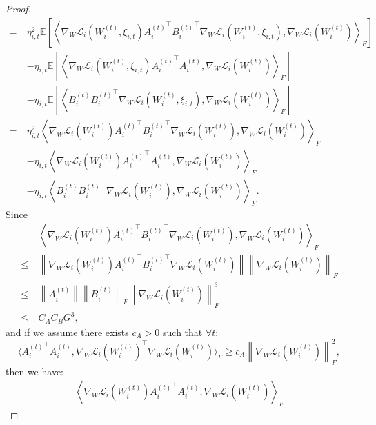 \begin{proof}
\begin{align*}
= \ & \eta_{i,t}^2 \mathbb{E}\left[\left\langle \nabla_{W}\mathcal{L}_i(W_i^{(t)},\xi_{i,t}){A_i^{(t)}}^{\top}{B_i^{(t)}}^{\top}\nabla_{W}\mathcal{L}_i(W_i^{(t)},\xi_{i,t}),\nabla_{W}\mathcal{L}_i(W_i^{(t)})\right\rangle_F\right]\\
& - \eta_{i,t}\mathbb{E}\left[\left\langle \nabla_{W}\mathcal{L}_i(W_i^{(t)},\xi_{i,t}){A_i^{(t)}}^{\top}A_i^{(t)},\nabla_{W}\mathcal{L}_i(W_i^{(t)})\right\rangle_F\right]\\
& - \eta_{i,t}\mathbb{E}\left[\left\langle B_i^{(t)}{B_i^{(t)}}^{\top}\nabla_{W}\mathcal{L}_i(W_i^{(t)},\xi_{i,t}),\nabla_{W}\mathcal{L}_i(W_i^{(t)})\right\rangle_F\right]\\
= \ & \eta_{i,t}^2 \left\langle \nabla_{W}\mathcal{L}_i(W_i^{(t)}){A_i^{(t)}}^{\top}{B_i^{(t)}}^{\top}\nabla_{W}\mathcal{L}_i(W_i^{(t)}),\nabla_{W}\mathcal{L}_i(W_i^{(t)})\right\rangle_F\\
& - \eta_{i,t}\left\langle \nabla_{W}\mathcal{L}_i(W_i^{(t)}){A_i^{(t)}}^{\top}A_i^{(t)},\nabla_{W}\mathcal{L}_i(W_i^{(t)})\right\rangle_F\\
& - \eta_{i,t}\left\langle B_i^{(t)}{B_i^{(t)}}^{\top}\nabla_{W}\mathcal{L}_i(W_i^{(t)}),\nabla_{W}\mathcal{L}_i(W_i^{(t)})\right\rangle_F.
\end{align*}
Since
\begin{align*}
& \left\langle \nabla_{W}\mathcal{L}_i(W_i^{(t)}){A_i^{(t)}}^{\top}{B_i^{(t)}}^{\top}\nabla_{W}\mathcal{L}_i(W_i^{(t)}),\nabla_{W}\mathcal{L}_i(W_i^{(t)})\right\rangle_F\\
\leq \ & \left\| \nabla_{W}\mathcal{L}_i(W_i^{(t)}){A_i^{(t)}}^{\top}{B_i^{(t)}}^{\top}\nabla_{W}\mathcal{L}_i(W_i^{(t)})\right\|\left\|\nabla_{W}\mathcal{L}_i(W_i^{(t)})\right\|_F\\
\leq \ & \left\|{A_i^{(t)}}\right\|\left\|{B_i^{(t)}}\right\|_F\left\|\nabla_{W}\mathcal{L}_i(W_i^{(t)})\right\|_F^3\\
\leq \ & C_A C_B G^3,
\end{align*}
and if we 
assume there exists $c_A > 0$ such that $\forall t$:
\begin{equation*}
\Big\langle {A_i^{(t)}}^{\top}A_i^{(t)}, \nabla_{W}\mathcal{L}_i(W_i^{(t)})^{\top}\nabla_{W}\mathcal{L}_i(W_i^{(t)})\Big\rangle_F
\geq c_A \left\|\nabla_{W}\mathcal{L}_i(W_i^{(t)})\right\|_F^2,
\end{equation*}
then we have:
\begin{align*}
\left\langle \nabla_{W}\mathcal{L}_i(W_i^{(t)}){A_i^{(t)}}^{\top}A_i^{(t)},\nabla_{W}\mathcal{L}_i(W_i^{(t)})\right\rangle_F 

\end{align*}
\end{proof}
